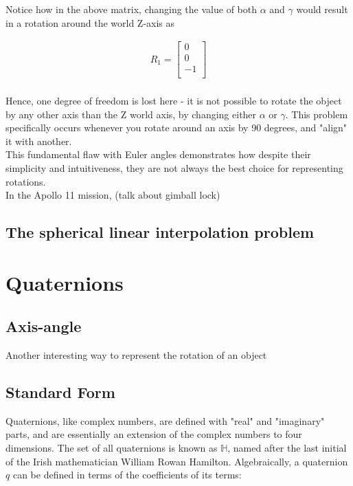 \documentclass[12pt, a4paper]{article}
\begin{document}
Notice how in the above matrix, changing the value of both $\alpha$ and $\gamma$
would result in a rotation around the world Z-axis as 

\begin{align*}
    R_1 = \begin{bmatrix} 0  \\
        0  \\
        -1 \\
    \end{bmatrix}
\end{align*} \\

Hence, one degree of freedom is lost here - it is not possible to rotate the
object by any other axis than the Z world axis, by changing either $\alpha$ or
$\gamma$. This problem specifically occurs whenever you rotate around an axis by
90 degrees, and "align" it with another. \\

This fundamental flaw with Euler angles demonstrates how despite their
simplicity and intuitiveness, they are not always the best choice for
representing rotations. \\

In the Apollo 11 mission, (talk about gimball lock)

\subsection{The spherical linear interpolation problem}

\section{Quaternions}
\subsection{Axis-angle}
Another interesting way to represent the rotation of an object 

\subsection{Standard Form}
Quaternions, like complex numbers, are defined with "real" and "imaginary"
parts, and are essentially an extension of the complex numbers to four
dimensions. The set of all quaternions is known as $\mathbb{H}$, named after the
last initial of the Irish mathematician William Rowan Hamilton. Algebraically, a
quaternion $q$ can be defined in terms of the coefficients of its terms:
\end{document}
